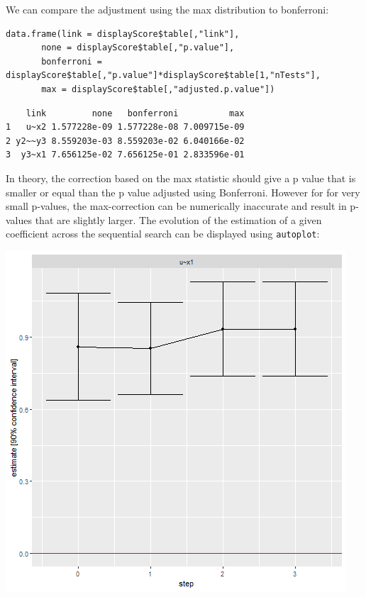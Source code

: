 \documentclass[12pt]{article}
\begin{document}
We can compare the adjustment using the max distribution to bonferroni:
\lstset{language=r,label= ,caption= ,captionpos=b,numbers=none}
\begin{lstlisting}
data.frame(link = displayScore$table[,"link"],
	   none = displayScore$table[,"p.value"],
	   bonferroni = displayScore$table[,"p.value"]*displayScore$table[1,"nTests"],
	   max = displayScore$table[,"adjusted.p.value"])
\end{lstlisting}

\begin{verbatim}
    link         none   bonferroni          max
1   u~x2 1.577228e-09 1.577228e-08 7.009715e-09
2 y2~~y3 8.559203e-03 8.559203e-02 6.040166e-02
3  y3~x1 7.656125e-02 7.656125e-01 2.833596e-01
\end{verbatim}


In theory, the correction based on the max statistic should give a p
value that is smaller or equal than the p value adjusted using
Bonferroni. However for for very small p-values, the max-correction
can be numerically inaccurate and result in p-values that are slightly
larger. The evolution of the estimation of a given coefficient across
the sequential search can be displayed using \texttt{autoplot}:

\begin{center}
\includegraphics[width=.9\linewidth]{./modelsearch.png}
\end{center}
\end{document}

